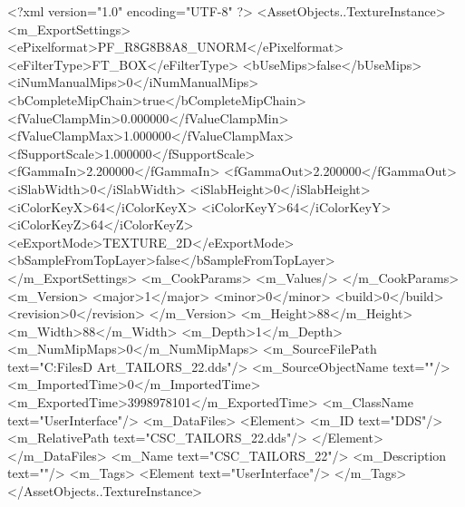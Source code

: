 <?xml version="1.0" encoding="UTF-8" ?>
<AssetObjects..TextureInstance>
	<m_ExportSettings>
		<ePixelformat>PF_R8G8B8A8_UNORM</ePixelformat>
		<eFilterType>FT_BOX</eFilterType>
		<bUseMips>false</bUseMips>
		<iNumManualMips>0</iNumManualMips>
		<bCompleteMipChain>true</bCompleteMipChain>
		<fValueClampMin>0.000000</fValueClampMin>
		<fValueClampMax>1.000000</fValueClampMax>
		<fSupportScale>1.000000</fSupportScale>
		<fGammaIn>2.200000</fGammaIn>
		<fGammaOut>2.200000</fGammaOut>
		<iSlabWidth>0</iSlabWidth>
		<iSlabHeight>0</iSlabHeight>
		<iColorKeyX>64</iColorKeyX>
		<iColorKeyY>64</iColorKeyY>
		<iColorKeyZ>64</iColorKeyZ>
		<eExportMode>TEXTURE_2D</eExportMode>
		<bSampleFromTopLayer>false</bSampleFromTopLayer>
	</m_ExportSettings>
	<m_CookParams>
		<m_Values/>
	</m_CookParams>
	<m_Version>
		<major>1</major>
		<minor>0</minor>
		<build>0</build>
		<revision>0</revision>
	</m_Version>
	<m_Height>88</m_Height>
	<m_Width>88</m_Width>
	<m_Depth>1</m_Depth>
	<m_NumMipMaps>0</m_NumMipMaps>
	<m_SourceFilePath text="C:\Users\Shadow\Desktop\Working Files\2D Art\Quarters\Tailors\CSC_TAILORS_22.dds"/>
	<m_SourceObjectName text=""/>
	<m_ImportedTime>0</m_ImportedTime>
	<m_ExportedTime>3998978101</m_ExportedTime>
	<m_ClassName text="UserInterface"/>
	<m_DataFiles>
		<Element>
			<m_ID text="DDS"/>
			<m_RelativePath text="CSC_TAILORS_22.dds"/>
		</Element>
	</m_DataFiles>
	<m_Name text="CSC_TAILORS_22"/>
	<m_Description text=""/>
	<m_Tags>
		<Element text="UserInterface"/>
	</m_Tags>
</AssetObjects..TextureInstance>

